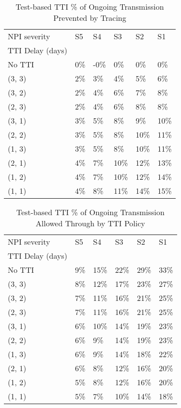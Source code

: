 \documentclass{article}
\begin{document}
    \begin{table}[H]
        \centering
         \begin{tabular}{llllll}
\toprule
NPI severity &   S5 &    S4 &    S3 &    S2 &    S1 \\
TTI Delay (days) &      &       &       &       &       \\
\midrule
No TTI           &  0\% &  -0\% &   0\% &   0\% &   0\% \\
(3, 3)           &  2\% &   3\% &   4\% &   5\% &   6\% \\
(3, 2)           &  2\% &   4\% &   6\% &   7\% &   8\% \\
(2, 3)           &  2\% &   4\% &   6\% &   8\% &   8\% \\
(3, 1)           &  3\% &   5\% &   8\% &   9\% &  10\% \\
(2, 2)           &  3\% &   5\% &   8\% &  10\% &  11\% \\
(1, 3)           &  3\% &   5\% &   8\% &  10\% &  11\% \\
(2, 1)           &  4\% &   7\% &  10\% &  12\% &  13\% \\
(1, 2)           &  4\% &   7\% &  10\% &  12\% &  14\% \\
(1, 1)           &  4\% &   8\% &  11\% &  14\% &  15\% \\
\bottomrule
\end{tabular}

        \caption{Test-based TTI \% of Ongoing Transmission Prevented by Tracing}
    \end{table}
    


    \begin{table}[H]
        \centering
         \begin{tabular}{llllll}
\toprule
NPI severity &   S5 &    S4 &    S3 &    S2 &    S1 \\
TTI Delay (days) &      &       &       &       &       \\
\midrule
No TTI           &  9\% &  15\% &  22\% &  29\% &  33\% \\
(3, 3)           &  8\% &  12\% &  17\% &  23\% &  27\% \\
(3, 2)           &  7\% &  11\% &  16\% &  21\% &  25\% \\
(2, 3)           &  7\% &  11\% &  16\% &  21\% &  25\% \\
(3, 1)           &  6\% &  10\% &  14\% &  19\% &  23\% \\
(2, 2)           &  6\% &   9\% &  14\% &  19\% &  23\% \\
(1, 3)           &  6\% &   9\% &  14\% &  18\% &  22\% \\
(2, 1)           &  6\% &   8\% &  12\% &  16\% &  20\% \\
(1, 2)           &  5\% &   8\% &  12\% &  16\% &  20\% \\
(1, 1)           &  5\% &   7\% &  10\% &  14\% &  18\% \\
\bottomrule
\end{tabular}

        \caption{Test-based TTI \% of Ongoing Transmission Allowed Through by TTI Policy}
    \end{table}
    
\end{document}
